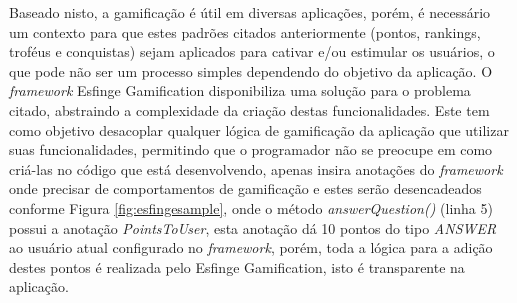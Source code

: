 

\par Baseado nisto, a gamificação é útil em diversas aplicações, porém, é necessário um contexto para que estes padrões citados anteriormente (pontos, rankings, troféus e conquistas) sejam aplicados para cativar e/ou estimular os usuários, o que pode não ser um processo simples dependendo do objetivo da aplicação. O \textit{framework} Esfinge Gamification disponibiliza uma solução para o problema citado, abstraindo a complexidade da criação destas funcionalidades. Este tem como objetivo desacoplar qualquer lógica de gamificação da aplicação que utilizar suas funcionalidades, permitindo que o programador não se preocupe em como criá-las no código que está desenvolvendo, apenas insira anotações do \textit{framework} onde precisar de comportamentos de gamificação  e estes serão desencadeados conforme Figura \ref{fig:esfingesample}, onde o método \textit{answerQuestion()} (linha 5) possui a anotação \textit{PointsToUser}, esta anotação dá 10 pontos do tipo \textit{ANSWER} ao usuário atual configurado no \textit{framework}, porém, toda a lógica para a adição destes pontos é realizada pelo Esfinge Gamification, isto é transparente na aplicação.

